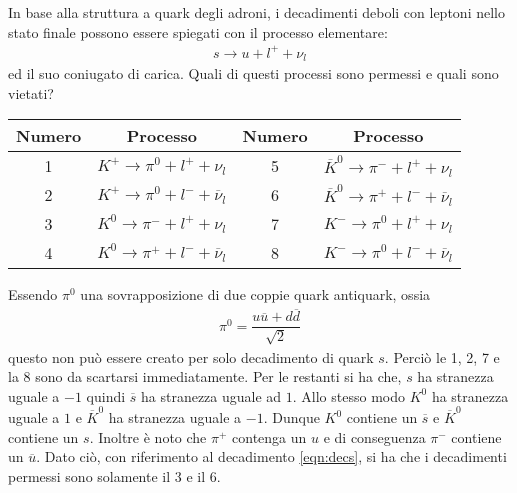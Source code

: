\documentclass[../main.tex]{subfiles}
\begin{document}
	\begin{ese}[16.4]
		In base alla struttura a quark degli adroni, i decadimenti deboli con leptoni nello stato finale possono essere spiegati con il processo elementare:
		\begin{gather}
		\label{eqn:decs}
		s\to u+l^{+}+\nu_{l}
		\end{gather}
		ed il suo coniugato di carica. Quali di questi processi sono permessi e quali sono vietati?
		\begin{center}
			\begin{tabular}{cc|cc}
				Numero & Processo & Numero & Processo \\ \hline
				1 & $ K^{+}\to\pi^{0}+l^{+}+\nu_{l} $ & 5 & $ \overline{K}^{0}\to\pi^{-}+l^{+}+\nu_{l} $ \\
				2 & $ K^{+}\to\pi^{0}+l^{-}+\overline{\nu}_{l} $ & 6 & $ \overline{K}^{0}\to\pi^{+}+l^{-}+\overline{\nu}_{l} $ \\
				3 & $ K^{0}\to\pi^{-}+l^{+}+\nu_{l} $ & 7 & $ K^{-}\to\pi^{0}+l^{+}+\nu_{l} $ \\
				4 & $ K^{0}\to\pi^{+}+l^{-}+\overline{\nu}_{l} $ & 8 & $ K^{-}\to\pi^{0}+l^{-}+\overline{\nu}_{l} $ \\
			\end{tabular}
		\end{center}
	\end{ese}
	\begin{svol}
		Essendo $ \pi^{0} $ una sovrapposizione di due coppie quark antiquark, ossia
		\begin{gather}
		\pi^{0}=\dfrac{u\overline{u}+d\overline{d}}{\sqrt{2}}
		\end{gather}
		questo non può essere creato per solo decadimento di quark $ s $. Perciò le 1, 2, 7 e la 8 sono da scartarsi immediatamente. Per le restanti si ha che, $ s $ ha stranezza uguale a $ -1 $ quindi $ \overline{s} $ ha stranezza uguale ad $ 1 $. Allo stesso modo $ K^{0} $ ha stranezza uguale a $ 1 $ e $ \overline{K}^{0} $ ha stranezza uguale a $ -1 $. Dunque $ K^{0} $ contiene un $ \overline{s} $ e $ \overline{K}^{0} $ contiene un $ s $. Inoltre è noto che $ \pi^{+} $ contenga un $ u $ e di conseguenza $ \pi^{-} $ contiene un $ \overline{u} $. Dato ciò, con riferimento al decadimento \ref{eqn:decs}, si ha che i decadimenti permessi sono solamente il 3 e il 6.
	\end{svol}
\end{document}
